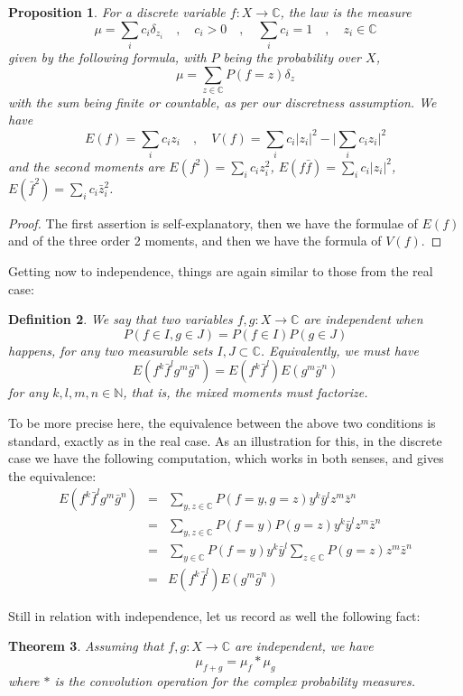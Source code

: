 \documentclass[12pt]{amsbook}
\newtheorem{theorem}{Theorem}[chapter]
\newtheorem{definition}[theorem]{Definition}
\newtheorem{proposition}[theorem]{Proposition}
\begin{document}
\begin{proposition}
For a discrete variable $f:X\to\mathbb C$, the law is the measure
$$\mu=\sum_i c_i\delta_{z_i}\quad,\quad c_i>0\quad,\quad\sum_ic_i=1\quad,\quad z_i\in\mathbb C$$
given by the following formula, with $P$ being the probability over $X$,
$$\mu=\sum_{z\in\mathbb C}P(f=z)\delta_z$$
with the sum being finite or countable, as per our discretness assumption. We have
$$E(f)=\sum_ic_iz_i\quad,\quad V(f)=\sum_ic_i|z_i|^2-\Big|\sum_ic_iz_i\Big|^2$$
and the second moments are $E(f^2)=\sum_ic_iz_i^2$, $E(f\bar{f})=\sum_ic_i|z_i|^2$, $E(\bar{f}^2)=\sum_ic_i\bar{z}_i^2$.
\end{proposition}

\begin{proof}
The first assertion is self-explanatory, then we have the formulae of $E(f)$ and of the three order 2 moments, and then we have the formula of $V(f)$.
\end{proof}

Getting now to independence, things are again similar to those from the real case:

\begin{definition}
We say that two variables $f,g:X\to\mathbb C$ are independent when
$$P(f\in I,g\in J)=P(f\in I)P(g\in J)$$
happens, for any two measurable sets $I,J\subset\mathbb C$. Equivalently, we must have
$$E(f^k\bar{f}^lg^m\bar{g}^n)=E(f^k\bar{f}^l)E(g^m\bar{g}^n)$$
for any $k,l,m,n\in\mathbb N$, that is, the mixed moments must factorize.
\end{definition}

To be more precise here, the equivalence between the above two conditions is standard, exactly as in the real case. As an illustration for this, in the discrete case we have the following computation, which works in both senses, and gives the equivalence:
\begin{eqnarray*}
E(f^k\bar{f}^lg^m\bar{g}^n)
&=&\sum_{y,z\in\mathbb C}P(f=y,g=z)y^k\bar{y}^lz^m\bar{z}^n\\
&=&\sum_{y,z\in\mathbb C}P(f=y)P(g=z)y^k\bar{y}^lz^m\bar{z}^n\\
&=&\sum_{y\in\mathbb C}P(f=y)y^k\bar{y}^l\sum_{z\in\mathbb C}P(g=z)z^m\bar{z}^n\\
&=&E(f^k\bar{f}^l)E(g^m\bar{g}^n)
\end{eqnarray*}

Still in relation with independence, let us record as well the following fact:

\begin{theorem}
Assuming that $f,g:X\to\mathbb C$ are independent, we have
$$\mu_{f+g}=\mu_f*\mu_g$$
where $*$ is the convolution operation for the complex probability measures.
\end{theorem}
\end{document}
